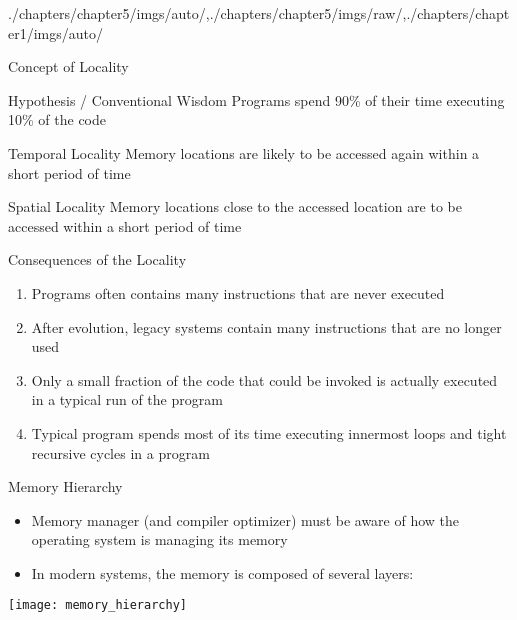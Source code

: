 \begin{graphicspathcontext}{{./chapters/chapter5/imgs/auto/},{./chapters/chapter5/imgs/raw/},{./chapters/chapter1/imgs/auto/}}
\begin{bibunit}[apalike]
\begin{frame}{Concept of Locality}
	\begin{block}{Hypothesis / Conventional Wisdom}
		Programs spend 90\% of their time executing 10\% of the code
	\end{block}
	\vspace{.5cm}
	\begin{definitionblock}{Temporal Locality}
		Memory locations are likely to be accessed again within a short period of time
	\end{definitionblock}
	\vspace{.5cm}
	\begin{definitionblock}{Spatial Locality}
		Memory locations close to the accessed location are to be accessed within a short period of time
	\end{definitionblock}
\end{frame}

\begin{frame}[background=6]{Consequences of the Locality}
	\begin{enumerate}
		\item Programs often contains many instructions that are never executed
		\vfill
		\item After evolution, legacy systems contain many instructions that are no longer used
		\vfill
		\item Only a small fraction of the code that could be invoked is actually executed in a typical run of the program
		\vfill
		\item Typical program spends most of its time executing innermost loops and tight recursive cycles in a program
	\end{enumerate}
\end{frame}

\begin{frame}{Memory Hierarchy}
	\begin{itemize}
		\item Memory manager (and compiler optimizer) must be aware of how the operating system is managing its memory
		\item In modern systems, the memory is composed of several layers:
	\end{itemize}
	\vspace{1em}
	\begin{center}
		\texttt{[image: memory\_hierarchy]}
	\end{center}
\end{frame}


\end{bibunit}
\end{graphicspathcontext}
